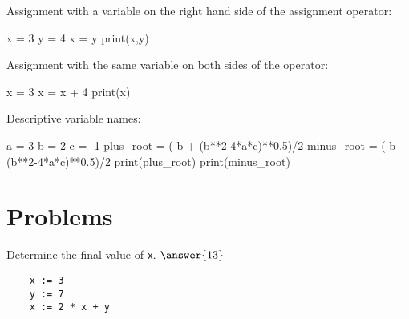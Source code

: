 \documentclass{ximera}
\begin{document}
Assignment with a variable on the right hand side of the assignment operator:

\begin{sageCell}
x = 3
y = 4
x = y
print(x,y)
\end{sageCell}

Assignment with the same variable on both sides of the operator:

\begin{sageCell}
x = 3
x = x + 4
print(x)
\end{sageCell}

Descriptive variable names:

\begin{sageCell}
a = 3
b = 2
c = -1
plus_root = (-b + (b**2-4*a*c)**0.5)/2
minus_root = (-b - (b**2-4*a*c)**0.5)/2
print(plus_root)
print(minus_root)
\end{sageCell}

\section{Problems}

\begin{question}
	Determine the final value of \verb|x|. $\answer{13}$
	\begin{verbatim}
	x := 3
	y := 7
	x := 2 * x + y
	\end{verbatim}
\end{question}
\end{document}
